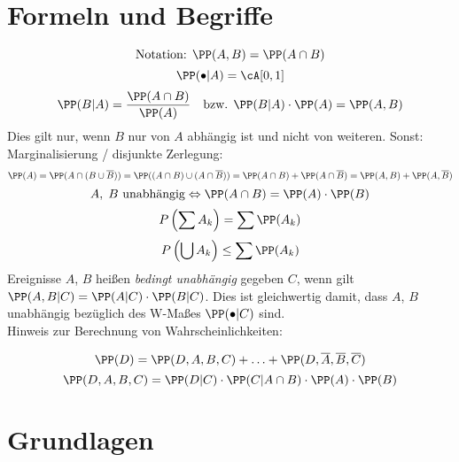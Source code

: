 \section{Formeln und Begriffe}
$$\text{Notation: } \PP(A,B)=\PP(A \cap B)$$
$$\PP(\bullet | A ) = \cA[0,1]$$
$$\PP(B|A)=\frac{\PP(A \cap B)}{\PP(A)} \quad \text{bzw. } \PP(B|A)\cdot \PP(A) = \PP(A,B)$$
Dies gilt nur, wenn $B$ nur von $A$ abhängig ist und nicht von weiteren. Sonst: Marginalisierung / disjunkte Zerlegung:
$$\PP(A) = \PP(A\cap (B \cup \overline{B}))=\PP((A \cap B) \cup (A \cap \overline{B}))=\PP(A \cap B) + \PP(A\cap \overline{B})=\PP(A,B)+\PP(A, \overline{B})$$
$$A, \;B \text{ unabhängig}\Leftrightarrow \PP(A \cap B)=\PP(A) \cdot \PP(B)$$
$$P\left(\sum A_k\right) = \sum \PP(A_k)$$
$$P\left(\bigcup A_k\right) \leq \sum \PP(A_k)$$
Ereignisse $A$, $B$ heißen \emph{bedingt unabhängig} gegeben $C$, wenn gilt $\PP(A,B|C) = \PP(A|C) \cdot \PP(B|C)$. Dies ist gleichwertig damit, dass $A$, $B$ unabhängig bezüglich des W-Maßes $\PP(\bullet|C)$ sind.\\
Hinweis zur Berechnung von Wahrscheinlichkeiten:
\begin{center}
\end{center}
$$\PP(D) = \PP(D,A,B,C) + \ldots + \PP(D, \overline{A}, \overline{B}, \overline{C})$$
$$\PP(D,A,B,C) = \PP(D|C) \cdot \PP(C|A \cap B) \cdot \PP(A) \cdot \PP(B)$$
\section{Grundlagen}

